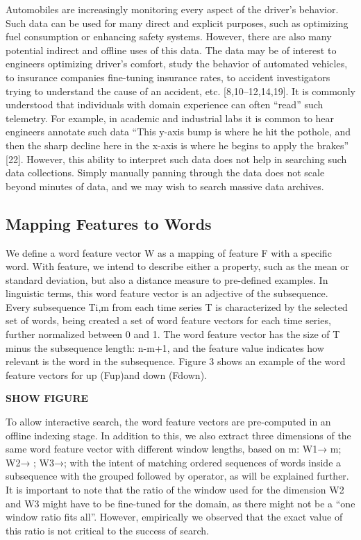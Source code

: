 Automobiles are increasingly monitoring every aspect of the driver’s behavior. Such data can be used for many direct and explicit purposes, such as optimizing fuel consumption or enhancing safety systems. However, there are also many potential indirect and offline uses of this data. The data may be of interest to engineers optimizing driver’s comfort, study the behavior of automated vehicles, to insurance companies fine-tuning insurance rates, to accident investigators trying to understand the cause of an accident, etc. [8,10–12,14,19]. It is commonly understood that individuals with domain experience can often “read” such telemetry. For example, in academic and industrial labs it is common to hear engineers annotate such data “This y-axis bump is where he hit the pothole, and then the sharp decline here in the x-axis is where he begins to apply the brakes” [22]. However, this ability to interpret such data does not help in searching such data collections. Simply manually panning through the data does not scale beyond minutes of data, and we may wish to search massive data archives.

\subsection{Mapping Features to Words}

We define a word feature vector W as a mapping of feature F with a specific word. With feature, we intend to describe either a property, such as the mean or standard deviation, but also a distance measure to pre-defined examples. In linguistic terms, this word feature vector is an adjective of the subsequence. Every subsequence Ti,m from each time series T is characterized by the selected set of words,  being created a set of word feature vectors for each time series, further normalized between 0 and 1. The word feature vector has the size of T minus the subsequence length: n-m+1, and the feature value indicates how relevant is the word in the subsequence. Figure 3 shows an example of the word feature vectors for up (Fup)and down (Fdown).

\textbf{SHOW FIGURE}

To allow interactive search, the word feature vectors are pre-computed in an offline indexing stage. In addition to this, we also extract three dimensions of the same word feature vector with different window lengths, based on m: W1→ m; W2→ ; W3→; with the intent of matching ordered sequences of words inside a subsequence with the grouped followed by operator, as will be explained further. It is important to note that the ratio of the window used for the dimension W2 and W3 might have to be fine-tuned for the domain, as there might not be a “one window ratio fits all”. However, empirically we observed that the exact value of this ratio is not critical to the success of search.

